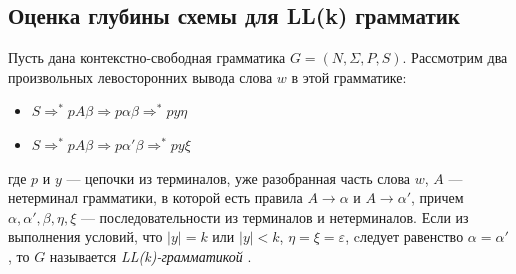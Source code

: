 \documentclass{spbau-diploma}
\begin{document}
\subsection{Оценка глубины схемы для LL(k) грамматик} 
Пусть дана контекстно-свободная грамматика  $G = (N, \Sigma, P, S)$. Рассмотрим два произвольных левосторонних вывода слова $w$ в этой грамматике:
\begin{itemize}
	\item $S \Rightarrow^* pA\beta \Rightarrow p \alpha \beta  \Rightarrow^*  py \eta$ 
	\item $S \Rightarrow^* pA\beta \Rightarrow p \alpha' \beta  \Rightarrow^*  py \xi$ 
\end{itemize}
где $p$ и $y$ --- цепочки из терминалов, уже разобранная часть слова $w$, $A$ --- нетерминал грамматики, в которой есть правила $A \rightarrow \alpha$ и $A \rightarrow \alpha'$, причем $\alpha, \alpha', \beta, \eta, \xi$ --- последовательности из терминалов и нетерминалов. Если из выполнения условий, что $|y| = k$ или $|y| < k$, $\eta = \xi = \varepsilon$, cледует равенство $\alpha = \alpha'$, то $G$ называется \textit{LL(k)-грамматикой} \cite{LL}.
\end{document}

